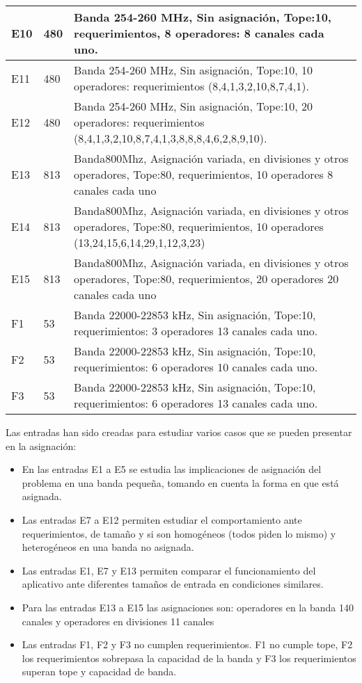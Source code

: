 \begin{center}
\begin{longtable}{|p{2cm}|p{2cm}|p{12.5cm}|}
	\hline
	E10 & 480 &Banda 254-260 MHz,  Sin asignación, Tope:10, requerimientos, 8 operadores: 8 canales cada uno. \\	
	\hline
	E11 & 480 &Banda 254-260 MHz,  Sin asignación, Tope:10, 10 operadores: requerimientos (8,4,1,3,2,10,8,7,4,1). \\	
	\hline
	E12 & 480 &Banda 254-260 MHz,  Sin asignación, Tope:10, 20 operadores: requerimientos (8,4,1,3,2,10,8,7,4,1,3,8,8,8,4,6,2,8,9,10). \\
	\hline
	E13 & 813 & Banda800Mhz,  Asignación variada, en divisiones y otros operadores, Tope:80, requerimientos, 10 operadores 8 canales cada uno\\	
	\hline
	E14 & 813 & Banda800Mhz,  Asignación variada, en divisiones y otros operadores, Tope:80, requerimientos, 10 operadores (13,24,15,6,14,29,1,12,3,23)\\
	\hline
	E15 & 813 & Banda800Mhz,  Asignación variada, en divisiones y otros operadores, Tope:80, requerimientos, 20 operadores 20 canales cada uno\\	
	\hline
	F1 & 53 & Banda 22000-22853 kHz, Sin asignación, Tope:10, requerimientos: 3 operadores 13 canales cada uno.\\
	\hline
	F2 & 53 & Banda 22000-22853 kHz, Sin asignación, Tope:10, requerimientos: 6 operadores 10 canales cada uno.\\
	\hline
	F3 & 53 & Banda 22000-22853 kHz, Sin asignación, Tope:10, requerimientos: 6 operadores 13 canales cada uno.\\
	\hline
\end{longtable}	
\end{center}

Las entradas han sido creadas para estudiar varios casos que se pueden presentar en la asignación:

\begin{itemize}
	\item En las entradas E1 a E5 se estudia las implicaciones de asignación del problema en una banda pequeña, tomando en cuenta la forma en que está asignada.
	\item Las entradas E7 a E12 permiten estudiar el comportamiento ante requerimientos, de tamaño y si son homogéneos (todos piden lo mismo) y heterogéneos en una banda no asignada.
	\item Las entradas E1, E7 y E13 permiten comparar el funcionamiento del aplicativo ante diferentes tamaños de entrada en condiciones similares.
	\item Para las entradas E13 a E15 las asignaciones son: operadores en la banda 140 canales y operadores en divisiones 11 canales
	\item Las entradas F1, F2 y F3 no cumplen requerimientos. F1 no cumple tope, F2 los requerimientos sobrepasa la capacidad de la banda y F3 los requerimientos superan tope y capacidad de banda.
\end{itemize}

